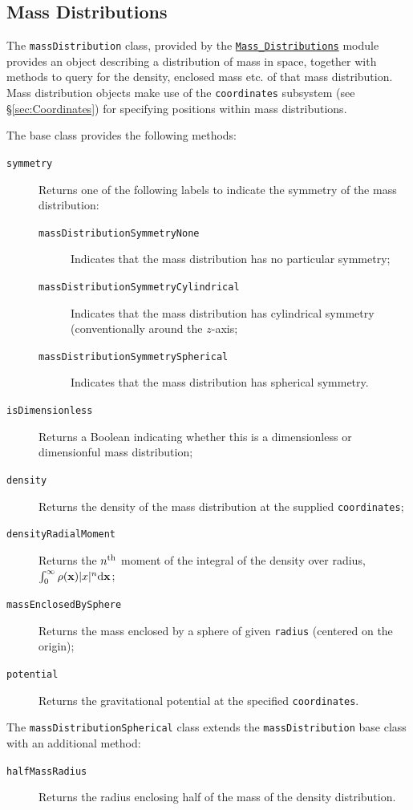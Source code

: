 \subsection{Mass Distributions}\label{sec:MassDistributions}

The {\tt massDistribution} class, provided by the \hyperlink{objects.mass_distributions.F90:mass_distributions}{\tt Mass\_Distributions} module provides an object describing a distribution of mass in space, together with methods to query for the density, enclosed mass etc. of that mass distribution. Mass distribution objects make use of the {\tt coordinates} subsystem (see \S\ref{sec:Coordinates}) for specifying positions within mass distributions.

The base class provides the following methods:
\begin{description}
\item [{\tt symmetry}] Returns one of the following labels to indicate the symmetry of the mass distribution:
 \begin{description}
  \item [{\tt massDistributionSymmetryNone}] Indicates that the mass distribution has no particular symmetry;
  \item [{\tt massDistributionSymmetryCylindrical}] Indicates that the mass distribution has cylindrical symmetry (conventionally around the $z$-axis;
  \item [{\tt massDistributionSymmetrySpherical}] Indicates that the mass distribution has spherical symmetry.
 \end{description}
\item [{\tt isDimensionless}] Returns a Boolean indicating whether this is a dimensionless or dimensionful mass distribution;
\item [{\tt density}] Returns the density of the mass distribution at the supplied {\tt coordinates};
\item [{\tt densityRadialMoment}] Returns the $n^{\rm th}$ moment of the integral of the density over radius, $\int_0^\infty \rho({\bf x}) |x|^n {\rm d} {\bf x}$; 
\item [{\tt massEnclosedBySphere}] Returns the mass enclosed by a sphere of given {\tt radius} (centered on the origin);
\item [{\tt potential}] Returns the gravitational potential at the specified {\tt coordinates}.
\end{description}

The {\tt massDistributionSpherical} class extends the {\tt massDistribution} base class with an additional method:
\begin{description}
 \item [{\tt halfMassRadius}] Returns the radius enclosing half of the mass of the density distribution.
\end{description}

